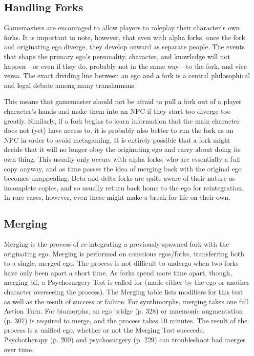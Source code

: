 \subsection{Handling Forks} 

Gamemasters are encouraged to allow players to roleplay their character's own forks. It is important to note, however, that even with alpha forks, once the fork and originating ego diverge, they develop onward as separate people. The events that shape the primary ego's personality, character, and knowledge will not happen—or even if they do, probably not in the same way—to the fork, and vice versa. The exact dividing line between an ego and a fork is a central philosophical and legal debate among many transhumans. 

This means that gamemaster should not be afraid to pull a fork out of a player character's hands and make them into an NPC if they start too diverge too greatly. Similarly, if a fork begins to learn information that the main character does not (yet) have access to, it is probably also better to run the fork as an NPC in order to avoid metagaming. It is entirely possible that a fork might decide that it will no longer obey the originating ego and carry about doing its own thing. This usually only occurs with alpha forks, who are essentially a full copy anyway, and as time passes the idea of merging back with the original ego becomes unappealing. Beta and delta forks are quite aware of their nature as incomplete copies, and so usually return back home to the ego for reintegration. In rare cases, however, even these might make a break for life on their own. 

\subsection{Merging} 

Merging is the process of re-integrating a previously-spawned fork with the originating ego. Merging is performed on conscious egos/forks, transferring both to a single, merged ego. The process is not difficult to undergo when two forks have only been apart a short time. As forks spend more time apart, though, merging bll, a Psychosurgery Test is called for (made either by the ego or another character overseeing the process). The Merging table lists modifiers for this test as well as the result of success or failure. For synthmorphs, merging takes one full Action Turn. For biomorphs, an ego bridge (p. 328) or mnemonic augmentation (p. 307) is required to merge, and the process takes 10 minutes. The result of the process is a unified ego, whether or not the Merging Test succeeds. Psychotherapy (p. 209) and psychosurgery (p. 229) can troubleshoot bad merges over time. \\ 

